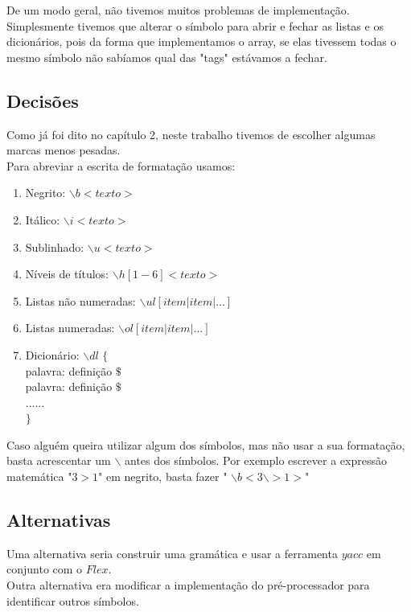 \documentclass{report}
\begin{document}
De um modo geral, não tivemos muitos problemas de implementação. Simplesmente tivemos que alterar o símbolo para abrir e fechar as listas e os dicionários, pois da forma que implementamos o array, se elas tivessem todas o mesmo símbolo não sabíamos qual das "tags" estávamos a fechar.    


\subsection{Decisões}
Como já foi dito no capítulo 2, neste trabalho tivemos de escolher algumas marcas menos pesadas.\\ 
Para abreviar a escrita de formatação usamos: 

\begin{enumerate}[1-] 

\item Negrito: $\backslash$$b$$<texto>$ 

\item Itálico: $\backslash$$i$$<texto>$ 

\item Sublinhado: $\backslash$$u$$<texto>$ 

\item Níveis de títulos: $\backslash$$h[1-6]$$<texto>$ 

\item Listas não numeradas: $\backslash$$ul$$[item | item|... ]$ 

\item Listas numeradas: $\backslash$$ol$$[item | item|... ]$ 

\item Dicionário: $\backslash$$dl$ $\{$ \\ 
palavra: definição $\$$\\ 
palavra: definição $\$$\\ 
......\\ 
$\}$

\end{enumerate}
Caso alguém queira utilizar algum dos símbolos, mas não usar a sua formatação, basta acrescentar um $\backslash$ 
antes dos símbolos. Por exemplo escrever a expressão matemática "$3>1$" em negrito, basta fazer  " $\backslash$$b$$<3$$\backslash$$>1>$" 

\subsection{Alternativas}

Uma alternativa seria construir uma gramática e usar a ferramenta $yacc$ em conjunto com o $Flex$.\\
Outra alternativa era modificar a implementação do pré-processador para identificar outros símbolos.
\end{document}
